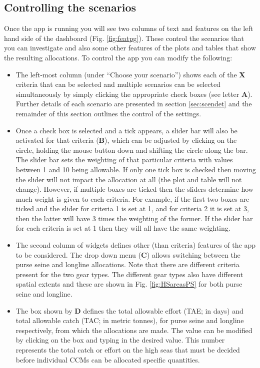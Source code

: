 \documentclass[11pt]{article}
\begin{document}
\subsection{Controlling the scenarios}
Once the app is running you will see two columns of text and features on the left hand side of the dashboard (Fig. \ref{fig:featpg}). These control the scenarios that you can investigate and also some other features of the plots and tables that show the resulting allocations. To control the app you can modify the following:
\begin{itemize}
\item The left-most column (under ``Choose your scenario'') shows each of the {\bf X} criteria that can be selected and multiple scenarios can be selected simultaneously by simply clicking the appropriate check boxes (see letter {\bf A}). Further details of each scenario are presented in section \ref{sec:scendet} and the remainder of this section outlines the control of the settings.
\item Once a check box is selected and a tick appears, a slider bar will also be activated for that criteria ({\bf B}), which can be adjusted by clicking on the circle, holding the mouse button down and shifting the circle along the bar. The slider bar sets the weighting of that particular criteria with values between 1 and 10 being allowable. If only one tick box is checked then moving the slider will not impact the allocation at all (the plot and table will not change). However, if multiple boxes are ticked then the sliders determine how much weight is given to each criteria. For example, if the first two boxes are ticked and the slider for criteria 1 is set at 1, and for criteria 2 it is set at 3, then the latter will have 3 times the weighting of the former. If the slider bar for each criteria is set at 1 then they will all have the same weighting.
\item The second column of widgets defines other (than criteria) features of the app to be considered. The drop down menu ({\bf C}) allows switching between the purse seine and longline allocations. Note that there are different criteria present for the two gear types. The different gear types also have different spatial extents and these are shown in Fig. \ref{fig:HSareasPS} for both purse seine and longline.
\item The box shown by {\bf D} defines the total allowable effort (TAE; in days) and total allowable catch (TAC; in metric tonnes), for purse seine and longline respectively, from which the allocations are made. The value can be modified by clicking on the box and typing in the desired value. This number represents the total catch or effort on the high seas that must be decided before individual CCMs can be allocated specific quantities.

\end{itemize}
\end{document}
